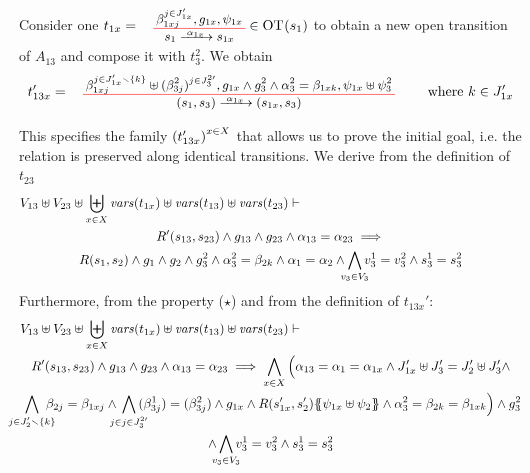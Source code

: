\documentclass[runningheads]{llncs}
\begin{document}
\begin{enumerate}
Consider one $t_{1x}=\OT{s_1}{s_{1x}}{\alpha_{1x}}{\beta_{1xj}^{j \in J'_{1x}}}{g_{1x}}{\psi_{1x}}\in \fOT{s_1}$ to obtain a new open transition of $A_{13}$ and compose it with $t_3^2$.
We obtain 
\[
t_{13x}' = \OT{\mpar{s_1, s_3}}{\mpar{s_{1x}, {s_3}}}{\alpha_{1x}}{\beta_{1xj}^{j \in J'_{1x} \setminus \{k\}} \uplus  {(\beta^2_{3j})^{j \in J^{2 \prime}_3} }}{g_{1x} \wedge g^2_3 \wedge \alpha^2_3 = \beta_{1xk}}{\psi_{1x} \uplus \psi^2_3} \qquad \text{ where } k \in J'_{1x} 
\]

This specifies the family ${\left(t_{13x}'\right)}^{x\in X}$
that allows us to prove the initial goal, i.e. the relation is preserved along identical transitions. We derive  from the definition of  $t_{23}$
\begin{multline*}
  V_{13} \uplus V_{23} \uplus  \biguplus_{x\in X}\fvars{t_{1x}}  \uplus \fvars{t_{13}} \uplus \fvars{t_{23}} 
\vdash \hspace{6cm}\\  R'\mpar{s_{13}, s_{23}} \wedge 	g_{13} \wedge g_{23} \wedge \alpha_{13} = \alpha_{23} 
\implies \\
 R\mpar{s_{1}, s_{2}} \wedge 	g_{1} \wedge g_2 \wedge g^2_3 \wedge \alpha^2_3 = \beta_{2k} \wedge \alpha_{1} = \alpha_{2} \wedge \bigwedge_\subbox{v_3\in V_3}
 v^1_3=v^2_3\wedge s^1_3 = s^2_3
\end{multline*}
Furthermore, from the property ($\star$) and from the definition of $t_{13x}'$:
\begin{multline*}
  V_{13} \uplus V_{23} \uplus  \biguplus_{x\in X}\fvars{t_{1x}}  \uplus \fvars{t_{13}} \uplus \fvars{t_{23}} 
\vdash \hspace{6cm}\\  R'\mpar{s_{13}, s_{23}} \wedge 	g_{13} \wedge g_{23} \wedge \alpha_{13} = \alpha_{23} 
\implies 
\bigwedge_{x\in X}
\Big(
 \alpha_{13}=\alpha_1=\alpha_{1 x}  \land J'_{1x}\uplus J'_3= J'_2\uplus J'_3\land \\
  \bigwedge_\subbox{j \in J'_2 \setminus\{k\} } \beta_{2j} = \beta_{1xj}
 \land \bigwedge_\subbox{j \in {j \in J^{2 \prime}_3} }  (\beta^1_{3j}) = (\beta^2_{3j}) \land g_{1 x}\land
 R\mpar{s'_{1x}, s'_{2}}\psubst{\psi_{1 x} \uplus \psi_2}\wedge \alpha^2_3 = \beta_{2k} = \beta_{1xk}\Big) \wedge g^2_3 \\
 \wedge \bigwedge_\subbox{v_3\in V_3}
 v^1_3=v^2_3\wedge s^1_3 = s^2_3
 \end{multline*}


\end{enumerate}
\end{document}

